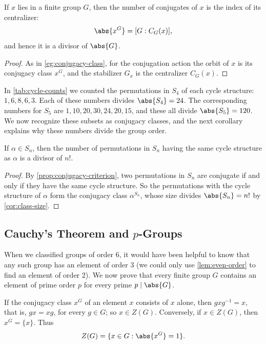 \begin{corollary}\label{cor:class-size}
	If \(x\) lies in a finite group \(G\), then the number of conjugates of \(x\) is the
	index of its centralizer:
	\[
		\abs{x^G} = [G : C_G(x)],
	\]
	and hence it is a divisor of \(\abs{G}\).
\end{corollary}

\begin{proof}
	As in \autoref{eg:conjugacy-class}, for the conjugation action the orbit of \(x\) is
	its conjugacy class \(x^G\), and the stabilizer \(G_x\) is the centralizer
	\(C_G(x)\).
\end{proof}

In \autoref{tab:cycle-counts} we counted the permutations in \(S_4\) of each cycle
structure: \(1, 6, 8, 6, 3\). Each of these numbers divides \(\abs{S_4} = 24\). The
corresponding numbers for \(S_5\) are \(1, 10, 20, 30, 24, 20, 15\), and these all divide
\(\abs{S_5} = 120\). We now recognize these subsets as conjugacy classes, and the next
corollary explains why these numbers divide the group order.

\begin{corollary}\label{cor:cycle-structure-count}
	If \(\alpha \in S_n\), then the number of permutations in \(S_n\) having the same cycle
	structure as \(\alpha\) is a divisor of \(n!\).
\end{corollary}

\begin{proof}
	By \autoref{prop:conjugacy-criterion}, two permutations in \(S_n\) are conjugate if
	and only if they have the same cycle structure. So the permutations with the cycle
	structure of \(\alpha\) form the conjugacy class \(\alpha^{S_n}\), whose size divides
	\(\abs{S_n} = n!\) by \autoref{cor:class-size}.
\end{proof}

\subsection{Cauchy's Theorem and \(p\)-Groups}

When we classified groups of order \(6\), it would have been helpful to know that any such
group has an element of order \(3\) (we could only use \autoref{lem:even-order} to find
an element of order \(2\)). We now prove that every finite group \(G\) contains an element
of prime order \(p\) for every prime \(p \mid \abs{G}\).

If the conjugacy class \(x^G\) of an element \(x\) consists of \(x\) alone, then
\(gxg^{-1} = x\), that is, \(gx = xg\), for every \(g \in G\); so \(x \in Z(G)\).
Conversely, if \(x \in Z(G)\), then \(x^G = \{x\}\). Thus
\[
	Z(G) = \{x \in G : \abs{x^G} = 1\}.
\]

